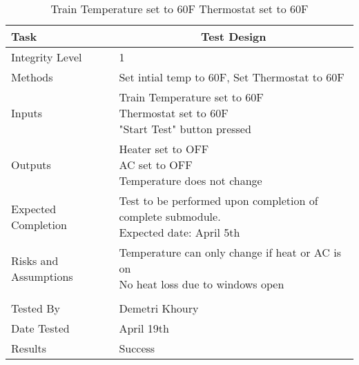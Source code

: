 \documentclass[]{article}
\begin{document}
	\begin{table}[H]
		\centering
		\caption{Train Temperature set to 60F Thermostat set to 60F}
		\begin{tabular}{|l|l|}
			\hline
			Task & \multicolumn{1}{c|}{Test Design} \\ \hline
			Integrity Level & 1 \\ \hline
			Methods & Set intial temp to 60F, Set Thermostat to 60F  \\ \hline
			Inputs &  \parbox[t]{10cm}{Train Temperature set to 60F\\ Thermostat set to 60F\\ "Start Test" button pressed }\\ \hline
			Outputs &\parbox[t]{10cm}{ Heater set to OFF\\AC set to OFF\\ Temperature does not change} \\ \hline
			Expected Completion & \parbox[t]{10cm}{Test to be performed upon completion of complete submodule.\\ Expected date: April 5th}\\ \hline
			Risks and Assumptions & \parbox[t]{10cm}{Temperature can only change if heat or AC is on\\ No heat loss due to windows open}\\ \hline
			\\ \hline
			Tested By   &  Demetri Khoury\\	\hline
			Date Tested & \parbox[t]{10cm}{April 19th}\\ \hline
			Results & Success\\ \hline
		\end{tabular}
	\end{table}
\end{document}
